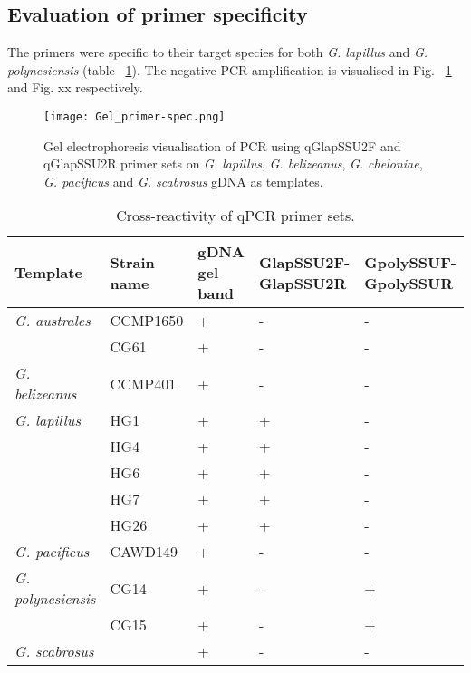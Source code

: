 \documentclass[12pt]{article}
\begin{document}
\subsection{Evaluation of primer specificity}
The primers were specific to their target species for both \emph{G. lapillus} and \emph{G. polynesiensis} (table ~\ref{tbl:CrossreactTable}). The negative PCR  amplification is visualised in Fig. ~\ref{fig:lapgel} and Fig. xx respectively.
\FloatBarrier 
\begin{figure} 
\texttt{[image: Gel\_primer-spec.png]} 
\caption{Gel electrophoresis visualisation of PCR using qGlapSSU2F and qGlapSSU2R primer sets on \emph{G. lapillus}, \emph{G. belizeanus}, \emph{G. cheloniae}, \emph{G. pacificus} and \emph{G. scabrosus} gDNA as templates.} 
\label{fig:lapgel}
\end{figure} 
\FloatBarrier

\FloatBarrier
\begin{table}
\caption{Cross-reactivity of qPCR primer sets.}
\label{tbl:CrossreactTable}
\begin{tabular}{ | p{4cm} | p{3cm} | p{2cm} | p{2.5cm} | p{2.5cm} | }
\hline
\textbf{Template} & \textbf{Strain name} & \textbf{gDNA gel band} & \textbf{GlapSSU2F-GlapSSU2R} & \textbf{GpolySSUF-GpolySSUR} \\
\hline
\emph{G. australes} & CCMP1650 &+&-&- \\
\hline
& CG61 &+&-&- \\
\hline
\emph{G. belizeanus}&CCMP401&+&-&-\\
\hline
\emph{G. lapillus}&HG1&+&+&-\\
\hline
&HG4&+&+&-\\
\hline
&HG6&+&+&-\\
\hline
&HG7&+&+&-\\
\hline
&HG26&+&+&-\\
\hline
\emph{G. pacificus}&CAWD149&+&-&-\\
\hline
\emph{G. polynesiensis}&CG14&+&-&+\\
\hline
&CG15&+&-&+\\
\hline
\emph{G. scabrosus}&&+&-&-\\
\hline
\end{tabular}
\end{table}
\FloatBarrier
 
\end{document}

